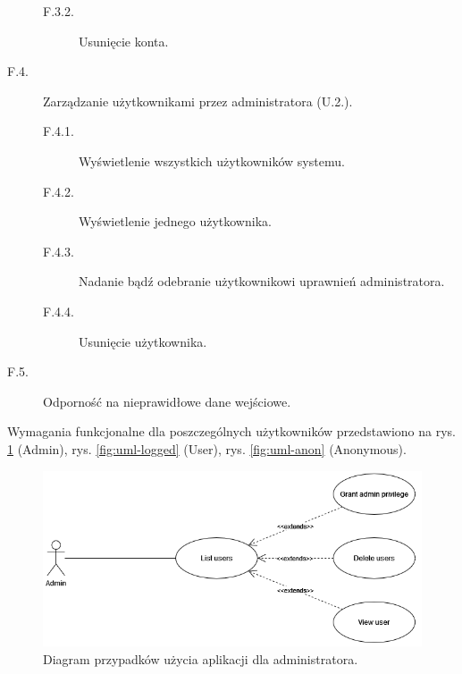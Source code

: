 \documentclass[a4paper,twoside,12pt]{book}
\begin{document}
\begin{description}
\begin{description}
		\item [F.3.2.] Usunięcie konta.
	\end{description}
	\item [F.4.] Zarządzanie użytkownikami przez administratora (U.2.).
	\begin{description}
		\item [F.4.1.] Wyświetlenie wszystkich użytkowników systemu.
		\item [F.4.2.] Wyświetlenie jednego użytkownika.
		\item [F.4.3.] Nadanie bądź odebranie użytkownikowi uprawnień administratora.
		\item [F.4.4.] Usunięcie użytkownika.
	\end{description}
	\item [F.5.] Odporność na nieprawidłowe dane wejściowe.
\end{description}

Wymagania funkcjonalne dla poszczególnych użytkowników przedstawiono na rys. \ref{fig:uml-admin} (Admin), rys. \ref{fig:uml-logged} (User), rys. \ref{fig:uml-anon} (Anonymous).

\begin{figure}
\centering
\includegraphics[width=\textwidth]{./UML-Admin.png}
\caption{Diagram przypadków użycia aplikacji dla administratora.}
\label{fig:uml-admin}
\end{figure}
\end{document}
